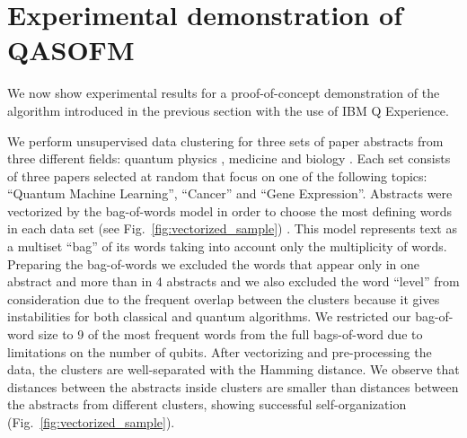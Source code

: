 \documentclass[pra,showkeys,twocolumn,showpacs,aps,10pt]{revtex4-1}
\begin{document}
























\section{Experimental demonstration of QASOFM}

We now show experimental results for a proof-of-concept demonstration of the algorithm introduced in the previous section with the use of IBM Q Experience.

We perform unsupervised data clustering for three sets of paper abstracts from three different fields:
quantum physics \cite{qml0, qml1, qml2},
medicine \cite{med0, med1, med2}
and biology \cite{bio0, bio1, bio2}.
Each set consists of three papers selected at random that focus on one of the following topics:
``Quantum Machine Learning'',
``Cancer''
and ``Gene Expression''.
Abstracts were vectorized by the bag-of-words \cite{weikang2016} model in order to choose the most defining words in each data set (see Fig.~\ref{fig:vectorized_sample}) \cite{mctear2016}.
This model represents text as a multiset ``bag'' of its words taking into account only the multiplicity of words.
Preparing the bag-of-words we excluded the words that appear only in one abstract and more than in 4 abstracts and we also excluded the word ``level'' from consideration due to the frequent overlap between the clusters because it gives instabilities for both classical and quantum algorithms.
We restricted our bag-of-word size to 9 of the most frequent words from the full bags-of-word  due to limitations on the number of qubits.
After vectorizing and pre-processing  the data, the clusters are well-separated with the Hamming distance.
We observe that distances between the abstracts inside clusters are smaller than distances between the abstracts from different clusters,
showing successful self-organization (Fig.~\ref{fig:vectorized_sample}).
\end{document}
